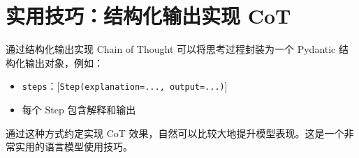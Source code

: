 \section{实用技巧：结构化输出实现 CoT}

\begin{importantbox}{通过结构化输出实现 Chain of Thought}
可以将思考过程封装为一个 Pydantic 结构化输出对象，例如：
\begin{itemize}
    \item \texttt{steps}：{[}\texttt{Step(explanation=..., output=...)}{]}
    \item 每个 Step 包含解释和输出
\end{itemize}
通过这种方式约定实现 CoT 效果，自然可以比较大地提升模型表现。这是一个非常实用的语言模型使用技巧。
\end{importantbox}

